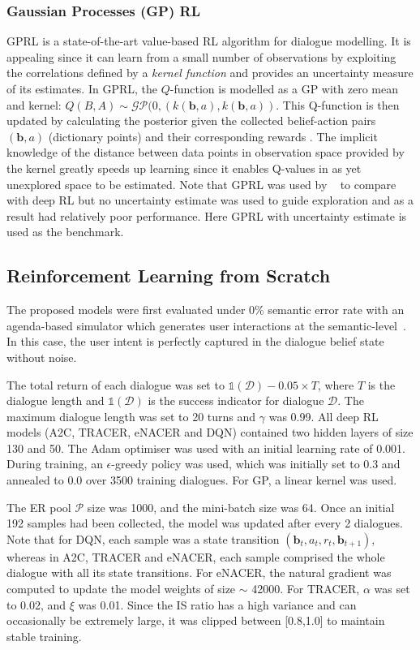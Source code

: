 \documentclass[11pt,a4paper]{article}
\begin{document}
\subsubsection{Gaussian Processes (GP) RL}
GPRL is a state-of-the-art value-based RL algorithm for dialogue modelling.
It is appealing since it can learn from a small number of observations by exploiting the correlations defined by a {\it kernel function} and provides an uncertainty measure of its estimates. In GPRL, the $Q$-function is modelled as a GP with zero mean and kernel: $Q(B, A) \sim \mathcal{GP}(0, (k(\mathbf{b}, a), k(\mathbf{b}, a))$. This Q-function is then updated by calculating the posterior given the collected belief-action pairs $(\mathbf{b},a)$ (dictionary points) and their corresponding rewards \cite{GPRL}. The implicit knowledge of the distance between data points in  observation space provided by the kernel greatly speeds up  learning  since it enables Q-values in as yet unexplored space to be estimated.
Note that GPRL was used by ~ to compare with deep RL but no uncertainty estimate was used to guide exploration and as a result had relatively poor performance. 
Here GPRL with uncertainty estimate is used as 
the benchmark.

\subsection{Reinforcement Learning from Scratch} \label{sec:RL}
The proposed models were first evaluated under 0\% semantic error rate with an agenda-based simulator which generates user interactions at the semantic-level~\cite{schatzmann2006survey}. In this case, the user intent is perfectly captured in the dialogue belief state without noise. 

The total return of each dialogue was set to $\mathds{1}(\mathcal{D})- 0.05 \times T$, where $T$ is the dialogue length and $\mathds{1}(\mathcal{D})$ is the success indicator for dialogue $\mathcal{D}$. The maximum dialogue length was set to 20 turns and $\gamma$ was 0.99. All deep RL models (A2C, TRACER, eNACER and DQN) contained two hidden layers of size 130 and 50.
The Adam optimiser was used \cite{kingma2014adam} with an initial learning rate of 0.001. During training, an $\epsilon$-greedy policy was used,
which was initially set to 0.3 and annealed to 0.0 over 3500 training dialogues. For GP, a linear kernel was used.

The ER pool ${\mathcal{P}}$ size was 1000, and the mini-batch size was 64. Once an initial 192 samples had been collected, the model was updated after every 2 dialogues. Note that for DQN, each sample was a state transition $(\mathbf{b}_t, a_t, r_t, \mathbf{b}_{t+1})$, whereas in A2C, TRACER and eNACER, each sample comprised the whole dialogue with all its state transitions. 
For eNACER, the natural gradient was computed to update the model weights of size $\sim$ 42000. 
For TRACER, $\alpha$ 
was set to 0.02, and $\xi$ was 0.01. 
Since the IS ratio 
has a high variance and can occasionally be extremely large, it was clipped between [0.8,1.0] to maintain stable training.
\end{document}
